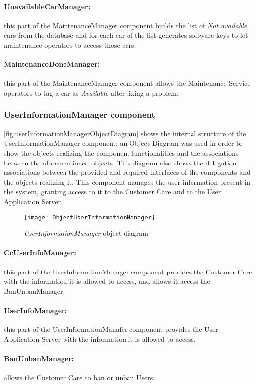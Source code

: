 \paragraph{UnavailableCarManager:} this part of the MaintenanceManager component builds the list of \emph{Not available} cars from the database and for each car of the list generates software keys to let maintenance operators to access those cars.
\paragraph{MaintenanceDoneManager:} this part of the MaintenanceManager component allows the Maintenance Service operators to tag a car as \emph{Available} after fixing a problem.

\subsubsection{UserInformationManager component}
\autoref{fig:userInformationManagerObjectDiagram} shows the internal structure of the UserInformationManager component; an Object Diagram was used in order to show the objects realizing the component functionalities and the associations between the aforementioned objects. This diagram also shows the delegation associations between the provided and required interfaces of the components and the objects realizing it.
This component manages the user information present in the system, granting access to it to the Customer Care and to the User Application Server.
\begin{figure}[h!]
	\centering
	\texttt{[image: ObjectUserInformationManager]}
	\caption{
		\label{fig:userInformationManagerObjectDiagram} 
		\emph{UserInformationManager} object diagram
	}
\end{figure}

\paragraph{CcUserInfoManager:} this part of the UserInformationManager component provides the Customer Care with the information it is allowed to access, and allows it access the BanUnbanManager.
\paragraph{UserInfoManager:} this part of the UserInformationManafer component provides the User Application Server with the information it is allowed to access.
\paragraph{BanUnbanManager:} allows the Customer Care to ban or unban Users.
